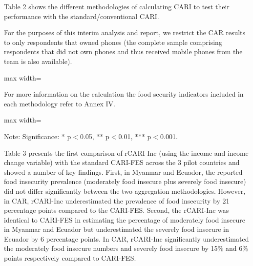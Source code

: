 \documentclass[11pt,harvard]{article}
\begin{document}
Table 2 shows the different methodologies of calculating CARI to test their performance with the standard/conventional CARI. 

For the purposes of this interim analysis and report, we restrict the CAR results to only respondents that owned phones (the complete sample comprising respondents that did not own phones and thus received mobile phones from the team is also available).  


\begin{table}[htbp]
	\centering
	\begin{adjustbox}{max width=\textwidth}
		\begin{threeparttable}
			\caption{Lists the different aggregation methods and indicators used for each methodology}
			\scriptsize
			 
			\label{tab:Aggregation_Table}
		\end{threeparttable}
	\end{adjustbox}
\end{table}
 
 For more information on the calculation the food security indicators included in each methodology refer to Annex IV. 
 
 
\begin{table}[htbp]
	\centering
	\begin{adjustbox}{max width=\textwidth}
		\begin{threeparttable}
			\caption{Impact of Survey Modality: Standard CARI-FES vs. Standard rCARI-Inc}
			\scriptsize
			 
			\label{tab:CARI_rCARI_Modality_All_Country}
			\begin{tablenotes}
				\item Note: Significance: * p$<$0.05, ** p$<$0.01, *** p$<$0.001. 
			\end{tablenotes}
		\end{threeparttable}
	\end{adjustbox}
\end{table}

Table 3 presents the first comparison of rCARI-Inc (using the income and income change variable) with the standard CARI-FES across the 3 pilot countries and showed a number of key findings. First, in Myanmar and Ecuador, the reported food insecurity prevalence (moderately food insecure plus severely food insecure) did not differ significantly between the two aggregation methodologies. However, in CAR, rCARI-Inc underestimated the prevalence of food insecurity by 21 percentage points compared to the CARI-FES. Second, the rCARI-Inc was identical to CARI-FES in estimating the percentage of moderately food insecure in Myanmar and Ecuador but underestimated the severely food insecure in Ecuador by 6 percentage points. In CAR, rCARI-Inc significantly underestimated the moderately food insecure numbers and severely food insecure by 15\% and 6\% points respectively compared to CARI-FES.
\end{document}
